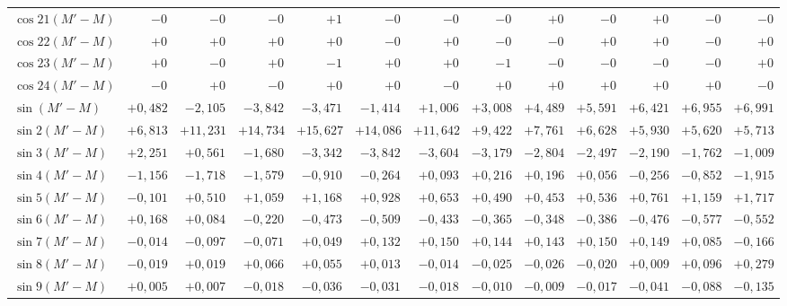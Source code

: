 \begin{landscape}
\begin{longtable}{@{}l|r|r|r|r|r|r|r|r|r|r|r|r@{}}
\(\cos 21(M'-M)\) & \(-0\) & \(-0\) & \(-0\) & \(+1\) & \(-0\) & \(-0\) & \(-0\) & \(+0\) & \(-0\) & \(+0\) & \(-0\) & \(-0\)\\
\(\cos 22(M'-M)\) & \(+0\) & \(+0\) & \(+0\) & \(+0\) & \(-0\) & \(+0\) & \(-0\) & \(-0\) & \(+0\) & \(+0\) & \(-0\) & \(+0\)\\
\(\cos 23(M'-M)\) & \(+0\) & \(-0\) & \(+0\) & \(-1\) & \(+0\) & \(+0\) & \(-1\) & \(-0\) & \(-0\) & \(-0\) & \(-0\) & \(+0\)\\
\(\cos 24(M'-M)\) & \(-0\) & \(+0\) & \(-0\) & \(+0\) & \(+0\) & \(-0\) & \(+0\) & \(+0\) & \(+0\) & \(+0\) & \(+0\) & \(-0\)\\[6pt]
\(\sin(M'-M)\) & \(+0{,}482\) & \(-2{,}105\) & \(-3{,}842\) & \(-3{,}471\) & \(-1{,}414\) & \(+1{,}006\) & \(+3{,}008\) & \(+4{,}489\) & \(+5{,}591\) & \(+6{,}421\) & \(+6{,}955\) & \(+6{,}991\)\\
\(\sin 2(M'-M)\) & \(+6{,}813\) & \(+11{,}231\) & \(+14{,}734\) & \(+15{,}627\) & \(+14{,}086\) & \(+11{,}642\) & \(+9{,}422\) & \(+7{,}761\) & \(+6{,}628\) & \(+5{,}930\) & \(+5{,}620\) & \(+5{,}713\)\\
\(\sin 3(M'-M)\) & \(+2{,}251\) & \(+0{,}561\) & \(-1{,}680\) & \(-3{,}342\) & \(-3{,}842\) & \(-3{,}604\) & \(-3{,}179\) & \(-2{,}804\) & \(-2{,}497\) & \(-2{,}190\) & \(-1{,}762\) & \(-1{,}009\)\\
\(\sin 4(M'-M)\) & \(-1{,}156\) & \(-1{,}718\) & \(-1{,}579\) & \(-0{,}910\) & \(-0{,}264\) & \(+0{,}093\) & \(+0{,}216\) & \(+0{,}196\) & \(+0{,}056\) & \(-0{,}256\) & \(-0{,}852\) & \(-1{,}915\)\\
\(\sin 5(M'-M)\) & \(-0{,}101\) & \(+0{,}510\) & \(+1{,}059\) & \(+1{,}168\) & \(+0{,}928\) & \(+0{,}653\) & \(+0{,}490\) & \(+0{,}453\) & \(+0{,}536\) & \(+0{,}761\) & \(+1{,}159\) & \(+1{,}717\)\\
\(\sin 6(M'-M)\) & \(+0{,}168\) & \(+0{,}084\) & \(-0{,}220\) & \(-0{,}473\) & \(-0{,}509\) & \(-0{,}433\) & \(-0{,}365\) & \(-0{,}348\) & \(-0{,}386\) & \(-0{,}476\) & \(-0{,}577\) & \(-0{,}552\)\\
\(\sin 7(M'-M)\) & \(-0{,}014\) & \(-0{,}097\) & \(-0{,}071\) & \(+0{,}049\) & \(+0{,}132\) & \(+0{,}150\) & \(+0{,}144\) & \(+0{,}143\) & \(+0{,}150\) & \(+0{,}149\) & \(+0{,}085\) & \(-0{,}166\)\\
\(\sin 8(M'-M)\) & \(-0{,}019\) & \(+0{,}019\) & \(+0{,}066\) & \(+0{,}055\) & \(+0{,}013\) & \(-0{,}014\) & \(-0{,}025\) & \(-0{,}026\) & \(-0{,}020\) & \(+0{,}009\) & \(+0{,}096\) & \(+0{,}279\)\\
\(\sin 9(M'-M)\) & \(+0{,}005\) & \(+0{,}007\) & \(-0{,}018\) & \(-0{,}036\) & \(-0{,}031\) & \(-0{,}018\) & \(-0{,}010\) & \(-0{,}009\) & \(-0{,}017\) & \(-0{,}041\) & \(-0{,}088\) & \(-0{,}135\)\\

\end{longtable}
\end{landscape}
